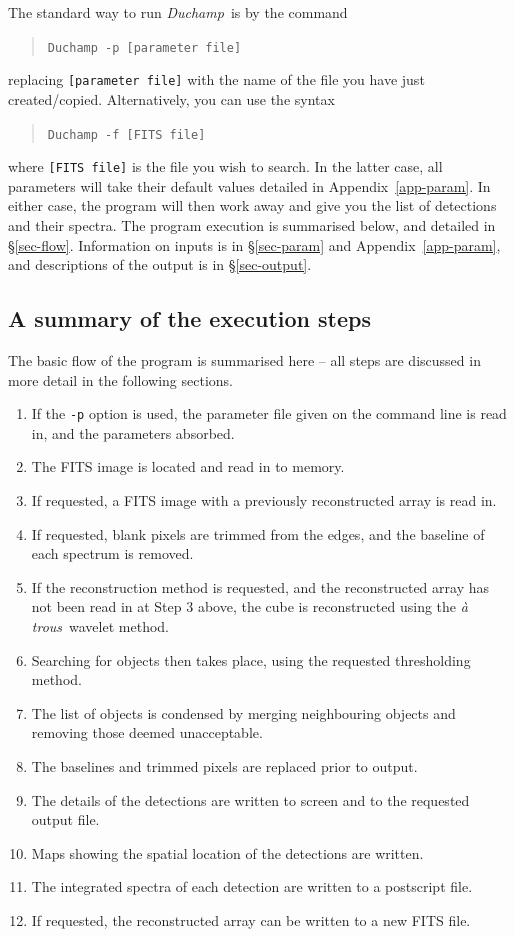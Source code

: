 \documentclass[12pt,a4paper]{article}
\newcommand{\duchamp}{\emph{Duchamp}}
\newcommand{\atrous}{\textit{{\`a} trous}}
\begin{document}
The standard way to run \duchamp\ is by the command
\begin{quote}
\texttt{Duchamp -p [parameter file]}
\end{quote}
replacing \texttt{[parameter file]} with the name of the file you have
just created/copied. Alternatively, you can use the syntax
\begin{quote}
\texttt{Duchamp -f [FITS file]}
\end{quote}
where \texttt{[FITS file]} is the file you wish to search. In the latter
case, all parameters will take their default values detailed in
Appendix~\ref{app-param}. In either case, the program will then work
away and give you the list of detections and their spectra. The
program execution is summarised below, and detailed in
\S\ref{sec-flow}. Information on inputs is in \S\ref{sec-param} and
Appendix~\ref{app-param}, and descriptions of the output is in
\S\ref{sec-output}.

\subsection{A summary of the execution steps}

The basic flow of the program is summarised here -- all steps are
discussed in more detail in the following sections.
\begin{enumerate}
\item If the \texttt{-p} option is used, the parameter file given on
  the command line is read in, and the parameters absorbed.
\item The FITS image is located and read in to memory.
\item If requested, a FITS image with a previously reconstructed array
  is read in.
\item If requested, blank pixels are trimmed from the edges, and
  the baseline of each spectrum is removed.
\item If the reconstruction method is requested, and the reconstructed
  array has not been read in at Step 3 above, the cube is
  reconstructed using the \atrous\ wavelet method.
\item Searching for objects then takes place, using the requested
  thresholding method.
\item The list of objects is condensed by merging neighbouring objects
  and removing those deemed unacceptable.
\item The baselines and trimmed pixels are replaced prior to output.
\item The details of the detections are written to screen and to the
  requested output file.
\item Maps showing the spatial location of the detections are written.
\item The integrated spectra of each detection are written to a
  postscript file. 
\item If requested, the reconstructed array can be written to a new
  FITS file.
\end{enumerate}
\end{document}

